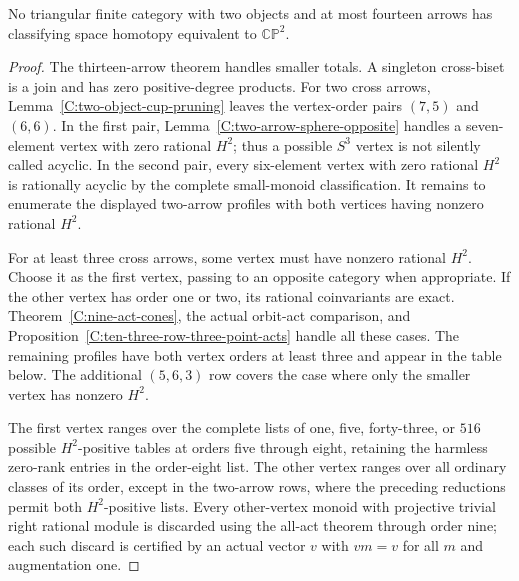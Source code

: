 \begin{proposition}
\label{C:fourteen-triangular}
No triangular finite category with two objects and at most fourteen
arrows has classifying space homotopy equivalent to
$\mathbb{CP}^2$.
\end{proposition}
\begin{proof}
The thirteen-arrow theorem handles smaller totals.  A singleton
cross-biset is a join and has zero positive-degree products.
For two cross arrows, Lemma~\ref{C:two-object-cup-pruning} leaves
the vertex-order pairs $(7,5)$ and $(6,6)$.  In the first pair,
Lemma~\ref{C:two-arrow-sphere-opposite} handles a seven-element
vertex with zero rational $H^2$; thus a possible $S^3$ vertex is
not silently called acyclic.  In the second pair, every six-element
vertex with zero rational $H^2$ is rationally acyclic by the
complete small-monoid classification.  It remains to enumerate
the displayed two-arrow profiles with both vertices having
nonzero rational $H^2$.

For at least three cross arrows, some vertex must have nonzero
rational $H^2$.  Choose it as the first vertex, passing to an
opposite category when appropriate.  If the other vertex has
order one or two, its rational coinvariants are exact.
Theorem~\ref{C:nine-act-cones}, the actual orbit-act comparison,
and Proposition~\ref{C:ten-three-row-three-point-acts} handle
all these cases.  The remaining profiles have both vertex orders
at least three and appear in the table below.  The additional
$(5,6,3)$ row covers the case where only the smaller vertex has
nonzero $H^2$.

The first vertex ranges over the complete lists of one, five,
forty-three, or $516$ possible $H^2$-positive tables at orders
five through eight, retaining the harmless zero-rank entries
in the order-eight list.  The other vertex ranges over all
ordinary classes of its order, except in the two-arrow rows,
where the preceding reductions permit both $H^2$-positive lists.
Every other-vertex monoid with projective trivial right rational
module is discarded using the all-act theorem through order nine;
each such discard is certified by an actual vector $v$ with
$vm=v$ for all $m$ and augmentation one.


\end{proof}
